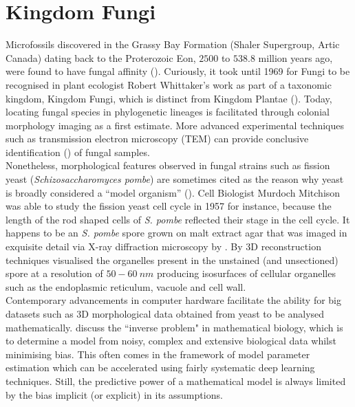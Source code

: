 \introduction

\section{Kingdom Fungi}

Microfossils discovered in the Grassy Bay Formation 
(Shaler Supergroup, Artic Canada) dating back to the Proterozoic Eon, $2500$ to $538.8$ million years ago, were 
found to have fungal affinity (\cite{loron2019early}). Curiously, it took until 1969 for Fungi to be 
recognised in plant ecologist Robert Whittaker's work as part of a taxonomic kingdom, Kingdom Fungi,
which is distinct from Kingdom Plantae (\cite{whittaker1969new}). Today, locating fungal species 
in phylogenetic lineages is facilitated through colonial morphology imaging as a first 
estimate. More advanced experimental techniques such as transmission 
electron microscopy (TEM) can provide  
conclusive identification (\cite{loron2019early}) of fungal samples.
\\

Nonetheless, morphological features observed in fungal strains such as fission yeast 
(\textit{Schizosaccharomyces pombe}) are sometimes cited as the reason 
why yeast is broadly considered a ``model organism'' (\cite{hayles2018introduction}).
Cell Biologist Murdoch Mitchison was able to study the fission yeast cell cycle in 1957 for instance,
because the length of the rod shaped cells of \textit{S. pombe} reflected their stage in the cell cycle.
It happens to be an \textit{S. pombe} spore grown on malt extract agar that was imaged in exquisite detail via 
X-ray diffraction microscopy by \cite{jiang2010quantitative}. By 3D 
reconstruction techniques \cite{jiang2010quantitative} visualised the organelles
present in the unstained (and unsectioned) spore at a resolution of $50-60 \ nm$ 
producing isosurfaces of cellular organelles such as the endoplasmic reticulum, 
vacuole and cell wall.
\\

Contemporary advancements in computer hardware facilitate 
the ability for big datasets such as 3D morphological data 
obtained from yeast to be analysed mathematically. \cite{clermont2015inverse} 
discuss the ``inverse problem" in mathematical biology, which is to determine a model 
from noisy, complex and extensive biological data whilst minimising bias. This often 
comes in the framework of model parameter estimation which 
can be accelerated using fairly systematic deep learning techniques. Still, the predictive power
of a mathematical model is always limited by the bias implicit (or explicit) in its assumptions.
\\

